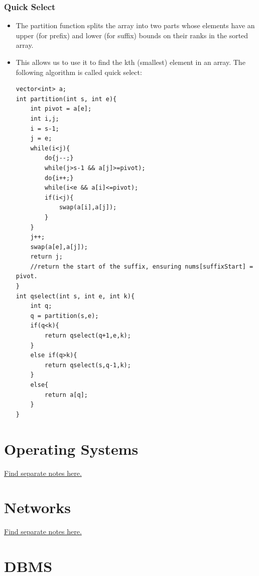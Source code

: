 \documentclass{report}
\begin{document}
\subsection{Quick Select}
\begin{itemize}
\item The partition function splits the array into two parts whose elements have an upper (for prefix) and lower (for suffix) bounds on their ranks in the sorted array.
\item This allows us to use it to find the kth (smallest) element in an array. The following algorithm is called quick select:
\begin{lstlisting}
vector<int> a;
int partition(int s, int e){
    int pivot = a[e];
    int i,j;
    i = s-1;
    j = e;
    while(i<j){
        do{j--;}
        while(j>s-1 && a[j]>=pivot);
        do{i++;}
        while(i<e && a[i]<=pivot);
        if(i<j){
            swap(a[i],a[j]);
        }
    }
    j++;
    swap(a[e],a[j]);
    return j;
    //return the start of the suffix, ensuring nums[suffixStart] = pivot.
}
int qselect(int s, int e, int k){
    int q;
    q = partition(s,e);
    if(q<k){
        return qselect(q+1,e,k);
    }
    else if(q>k){
        return qselect(s,q-1,k);
    }
    else{
        return a[q];
    }
}
\end{lstlisting}
\end{itemize}
\chapter{Operating Systems}
\href{C:/CODE/atgit/notes/osrev/osrev.pdf}
{Find separate notes here.}
\chapter{Networks}
\href{C:/CODE/atgit/notes/networks/networks.pdf}
{Find separate notes here.}
\chapter{DBMS}
\end{document}
